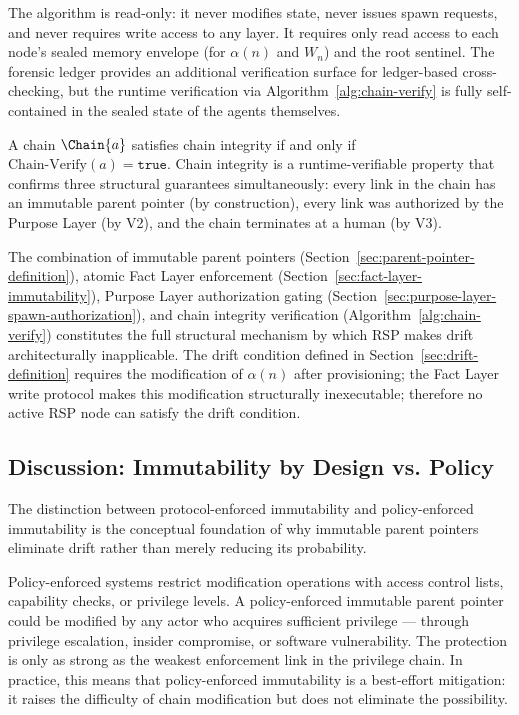 The algorithm is read-only: it never modifies state, never issues spawn requests, and never requires write access to any layer. It requires only read access to each node's sealed memory envelope (for $\alpha(n)$ and $W_n$) and the root sentinel. The forensic ledger provides an additional verification surface for ledger-based cross-checking, but the runtime verification via Algorithm~\ref{alg:chain-verify} is fully self-contained in the sealed state of the agents themselves.

\begin{dfn}
\label{dfn:chain-integrity}
A chain $\Chain{a}$ satisfies chain integrity if and only if $\text{Chain-Verify}(a) = \texttt{true}$. Chain integrity is a runtime-verifiable property that confirms three structural guarantees simultaneously: every link in the chain has an immutable parent pointer (by construction), every link was authorized by the Purpose Layer (by V2), and the chain terminates at a human (by V3).
\end{dfn}

The combination of immutable parent pointers (Section~\ref{sec:parent-pointer-definition}), atomic Fact Layer enforcement (Section~\ref{sec:fact-layer-immutability}), Purpose Layer authorization gating (Section~\ref{sec:purpose-layer-spawn-authorization}), and chain integrity verification (Algorithm~\ref{alg:chain-verify}) constitutes the full structural mechanism by which RSP makes drift architecturally inapplicable. The drift condition defined in Section~\ref{sec:drift-definition} requires the modification of $\alpha(n)$ after provisioning; the Fact Layer write protocol makes this modification structurally inexecutable; therefore no active RSP node can satisfy the drift condition.

\subsection{Discussion: Immutability by Design vs. Policy}
\label{sec:immutability-by-design}

The distinction between protocol-enforced immutability and policy-enforced immutability is the conceptual foundation of why immutable parent pointers eliminate drift rather than merely reducing its probability.

Policy-enforced systems restrict modification operations with access control lists, capability checks, or privilege levels. A policy-enforced immutable parent pointer could be modified by any actor who acquires sufficient privilege — through privilege escalation, insider compromise, or software vulnerability. The protection is only as strong as the weakest enforcement link in the privilege chain. In practice, this means that policy-enforced immutability is a best-effort mitigation: it raises the difficulty of chain modification but does not eliminate the possibility.

